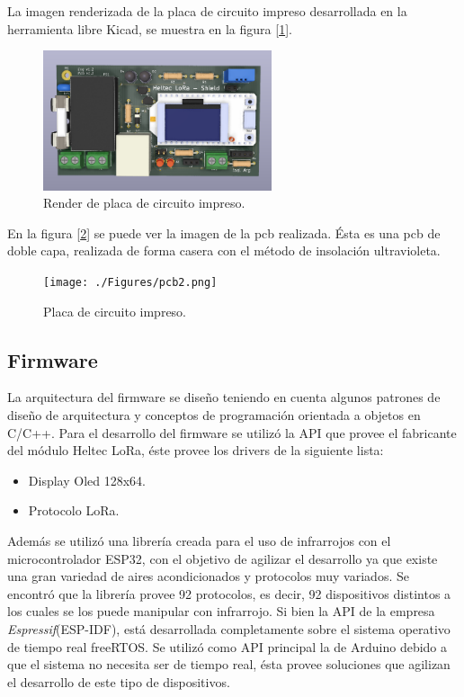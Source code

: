 La imagen renderizada de la placa de circuito impreso desarrollada en la herramienta libre Kicad, se muestra en la figura [\ref{fig:pcb1}].

\begin{figure}[h!]
	\centering
	\includegraphics[width=0.6\textwidth]{./Figures/pcb1.png}
	\caption{Render de placa de circuito impreso.}
	\label{fig:pcb1}
\end{figure} 

En la figura [\ref{fig:pcb2}] se puede ver la imagen de la pcb realizada. Ésta es una pcb de doble capa, realizada de forma casera con el método de insolación ultravioleta.

\begin{figure}[h!]
	\centering
	\texttt{[image: ./Figures/pcb2.png]}
	\caption{Placa de circuito impreso.}
	\label{fig:pcb2}
\end{figure} 

\subsection{Firmware}

La arquitectura del firmware se diseño teniendo en cuenta algunos patrones de diseño de arquitectura y conceptos de programación orientada a objetos en C/C++.
Para el desarrollo del firmware se utilizó la API que provee el fabricante del módulo Heltec LoRa, éste provee los drivers de la siguiente lista:

\begin{itemize}
\item Display Oled 128x64.
\item Protocolo LoRa.
\end{itemize}

Además se utilizó una librería creada para el uso de infrarrojos con el microcontrolador ESP32, con el objetivo de agilizar el desarrollo ya que existe una gran variedad de aires acondicionados y protocolos muy variados. Se encontró que la librería provee 92 protocolos, es decir, 92 dispositivos distintos a los cuales se los puede manipular con infrarrojo. Si bien la API de la empresa {\textit{Espressif}}(ESP-IDF), está desarrollada completamente sobre el sistema operativo de tiempo real freeRTOS. Se utilizó como API principal la de Arduino debido a que el sistema no necesita ser de tiempo real, ésta provee soluciones que agilizan el desarrollo de este tipo de dispositivos.

